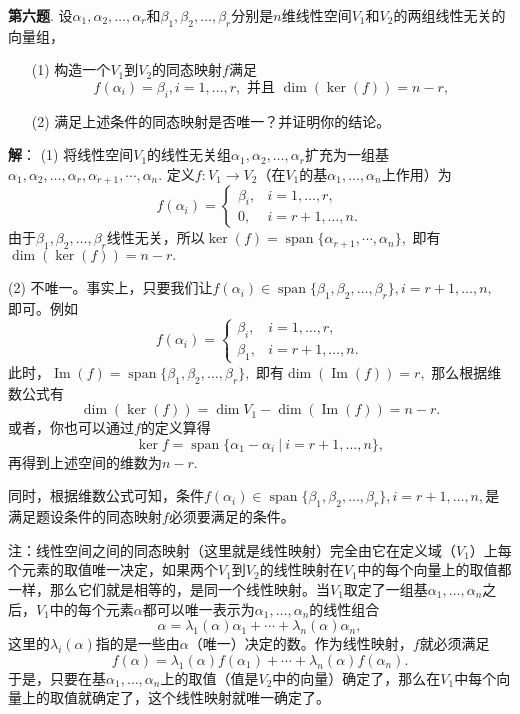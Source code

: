 \fi  %

\newpageorvspace

{\bf 第六题}. 设$\alpha_1, \alpha_2, \ldots, \alpha_r$和$\beta_1, \beta_2, \ldots, \beta_r$分别是$n$维线性空间$V_1$和$V_2$的两组线性无关的向量组，
\begin{itemize}
\item[(1)] 构造一个$V_1$到$V_2$的同态映射$f$满足
$$f(\alpha_i) = \beta_i, i = 1, \ldots, r, \text{ 并且 } \dim(\ker(f)) = n-r,$$
\item[(2)] 满足上述条件的同态映射是否唯一？并证明你的结论。
\end{itemize}

\ifIncludeAnswer

\newpageorvspace

{\bf 解}： (1) 将线性空间$V_1$的线性无关组$\alpha_1, \alpha_2, \ldots, \alpha_r$扩充为一组基$\alpha_1, \alpha_2, \ldots, \alpha_r, \alpha_{r+1}, \cdots, \alpha_n.$ 定义$f: V_1 \rightarrow V_2$（在$V_1$的基$\alpha_1, \ldots, \alpha_n$上作用）为
$$
f(\alpha_i) = \begin{cases}
\beta_i, & i = 1, \ldots, r, \\
0, & i = r+1, \ldots, n.
\end{cases}
$$
由于$\beta_1, \beta_2, \ldots, \beta_r$线性无关，所以$\ker(f) = \operatorname{span}\{ \alpha_{r+1}, \cdots, \alpha_n \},$ 即有$\dim(\ker(f)) = n-r.$

(2) 不唯一。事实上，只要我们让$f(\alpha_i) \in \operatorname{span} \{ \beta_1, \beta_2, \ldots, \beta_r \}, i = r+1, \ldots, n,$ 即可。例如
$$
f(\alpha_i) = \begin{cases}
\beta_i, & i = 1, \ldots, r, \\
\beta_1, & i = r+1, \ldots, n.
\end{cases}
$$
此时，$\operatorname{Im}(f) = \operatorname{span} \{ \beta_1, \beta_2, \ldots, \beta_r \},$ 即有$\dim(\operatorname{Im}(f)) = r,$ 那么根据维数公式有
$$\dim(\ker(f)) = \dim V_1 - \dim(\operatorname{Im}(f)) = n - r.$$
或者，你也可以通过$f$的定义算得
$$\ker f = \operatorname{span} \{ \alpha_1 - \alpha_i \ |\ i = r + 1, \ldots, n \},$$
再得到上述空间的维数为$n - r.$

同时，根据维数公式可知，条件$f(\alpha_i) \in \operatorname{span} \{ \beta_1, \beta_2, \ldots, \beta_r \}, i = r+1, \ldots, n,$是满足题设条件的同态映射$f$必须要满足的条件。

注：线性空间之间的同态映射（这里就是线性映射）完全由它在定义域（$V_1$）上每个元素的取值唯一决定，如果两个$V_1$到$V_2$的线性映射在$V_1$中的每个向量上的取值都一样，那么它们就是相等的，是同一个线性映射。当$V_1$取定了一组基$\alpha_1, \ldots, \alpha_n$之后，$V_1$中的每个元素$\alpha$都可以唯一表示为$\alpha_1, \ldots, \alpha_n$的线性组合
$$\alpha = \lambda_1(\alpha) \alpha_1 + \cdots + \lambda_n(\alpha) \alpha_n,$$
这里的$\lambda_i(\alpha)$指的是一些由$\alpha$（唯一）决定的数。作为线性映射，$f$就必须满足
$$f(\alpha) = \lambda_1(\alpha) f(\alpha_1) + \cdots + \lambda_n(\alpha) f(\alpha_n).$$
于是，只要在基$\alpha_1, \ldots, \alpha_n$上的取值（值是$V_2$中的向量）确定了，那么在$V_1$中每个向量上的取值就确定了，这个线性映射就唯一确定了。

\fi  %


